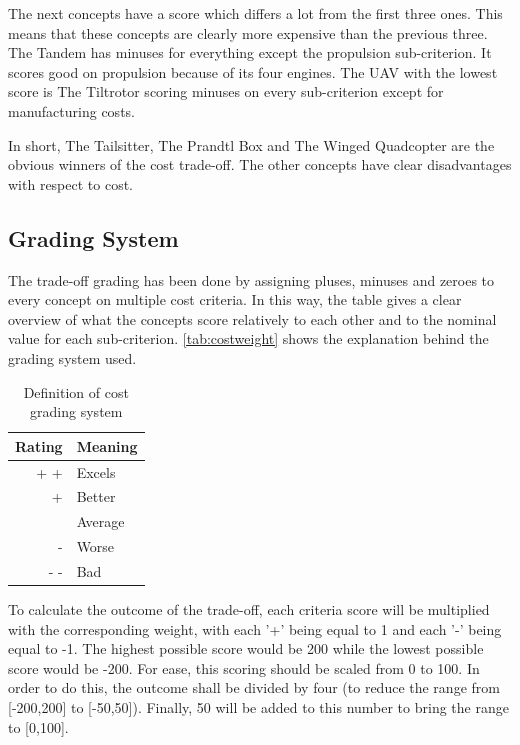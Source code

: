 The next concepts have a score which differs a lot from the first three ones. This means that these concepts are clearly more expensive than the previous three. The Tandem has minuses for everything except the propulsion sub-criterion. It scores good on propulsion because of its four engines. The UAV with the lowest score is The Tiltrotor scoring minuses on every sub-criterion except for manufacturing costs. 

In short, The Tailsitter, The Prandtl Box and The Winged Quadcopter are the obvious winners of the cost trade-off. The other concepts have clear disadvantages with respect to cost. 

\subsection{Grading System}

The trade-off grading has been done by assigning pluses, minuses and zeroes to every concept on multiple cost criteria. In this way, the table gives a clear overview of what the concepts score relatively to each other and to the nominal value for each sub-criterion. \autoref{tab:costweight} shows the explanation behind the grading system used. 

\begin{table}[H]
\centering
\caption{Definition of cost grading system}
\label{tab:costweight}
    \begin{tabular}{rl}
        \toprule
        \textbf{Rating}           & \textbf{Meaning}
        \\ \midrule
         + +            & Excels          
        \\ \hdashline
        +               & Better
        \\ \hdashline
         0          & Average 
        \\ \hdashline
          -           & Worse 
        \\ \hdashline
         - -    & Bad  %
        \\ \bottomrule
    \end{tabular}
\end{table}

To calculate the outcome of the trade-off, each criteria score will be multiplied with the corresponding weight, with each '+' being equal to 1 and each '-' being equal to -1. The highest possible score would be 200 while the lowest possible score would be -200. For ease, this scoring should be scaled from 0 to 100. In order to do this, the outcome shall be divided by four (to reduce the range from [-200,200] to [-50,50]). Finally, 50 will be added to this number to bring the range to [0,100].

